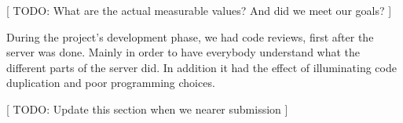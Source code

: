 [ TODO: What are the actual measurable values? And did we meet our goals? ]

During the project's development phase, we had code reviews, first after the server was done. Mainly in order to have everybody understand what the different parts of the server did. In addition it had the effect of illuminating code duplication and poor programming choices.

[ TODO: Update this section when we nearer submission ]